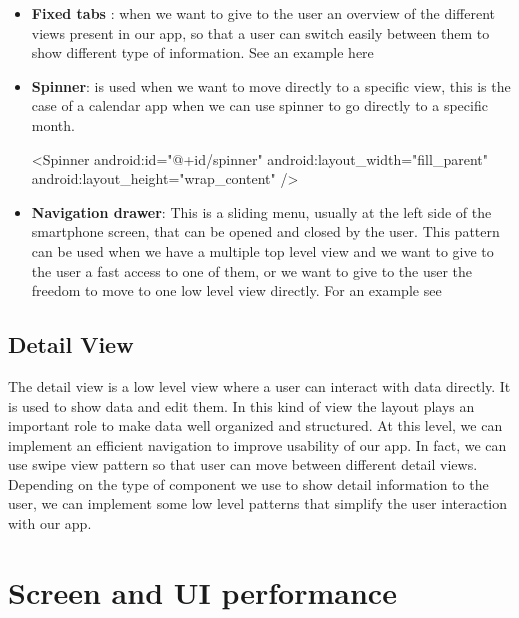 \begin{itemize}
	\item \textbf{Fixed tabs} : when we want to give to
	the user an overview of the different views present in our app, so that a user can switch easily between them to show different type of information. See an example here \cite{Tamada2013}
	
	\item \textbf{Spinner}: is used when we want to move directly to a specific view, this is the case of a calendar app when we can use spinner to
	go directly to a specific month.
	
	\begin{xml}
		<Spinner
		android:id="@+id/spinner"
		android:layout_width="fill_parent"
		android:layout_height="wrap_content" />
	\end{xml}
	
	
	\item \textbf{Navigation drawer}: This is a sliding menu, usually at the left side of the
	smartphone screen, that can be opened and closed by the user. This pattern can be used when we have a multiple top level view
	and we want to give to the user a fast access to one of them, or we want to give to the user the freedom to move to one low level
	view directly. For an example see  \cite{Google2017a}
\end{itemize}

\subsection{Detail View}
The detail view is a low level view where a user can interact with data directly. It is used to show data and edit them. In this
kind of view the layout plays an important role to make data well organized and structured. At this level, we can implement
an efficient navigation to improve usability of our app. In fact, we can use swipe view pattern so that user can move between
different detail views. Depending on the type of component we use to show detail information to the user, we can implement
some low level patterns that simplify the user interaction with our app.


\section{Screen and UI performance}




